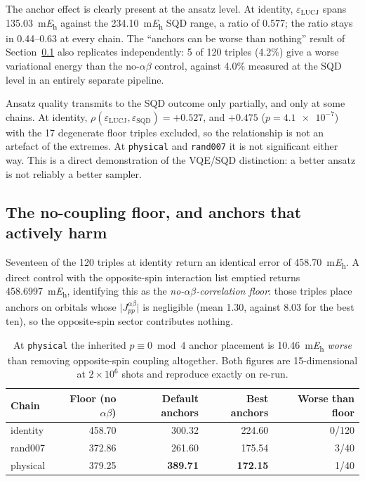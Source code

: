 \documentclass[11pt,a4paper]{article}
\begin{document}
The anchor effect is clearly present at the ansatz level. At 
identity, $\varepsilon_{\text{LUCJ}}$ spans \SI{135.03}{\milli\hartree}
against the \SI{234.10}{\milli\hartree} SQD range, a ratio of 0.577; the ratio
stays in \numrange{0.44}{0.63} at every chain. The
``anchors can be worse than nothing'' result of
Section~\ref{sec:floor} also replicates independently: 5 of 120 triples
(4.2\%) give a worse variational energy than the no-$\alpha\beta$ control,
against 4.0\% measured at the SQD level in an entirely separate pipeline.

Ansatz quality transmits to the SQD outcome only partially, and only at some
chains. At  identity,
$\rho(\varepsilon_{\text{LUCJ}}, \varepsilon_{\text{SQD}}) = +0.527$, and
$+0.475$ ($p=\num{4.1e-7}$) with the 17 degenerate floor triples excluded, so
the relationship is not an artefact of the extremes. At \texttt{physical} and
\texttt{rand007} it is not significant either way. This is a direct
demonstration of the VQE/SQD distinction: a better ansatz is not reliably a
better sampler.

\FloatBarrier
\subsection{The no-coupling floor, and anchors that actively harm}
\label{sec:floor}

Seventeen of the 120 triples at  identity return an identical error
of \SI{458.70}{\milli\hartree}. A direct control with the opposite-spin
interaction list emptied returns \SI{458.6997}{\milli\hartree}, identifying
this as the \emph{no-$\alpha\beta$-correlation floor}: those triples place
anchors on orbitals whose $\lvert J^{\alpha\beta}_{pp}\rvert$ is negligible
(mean 1.30, against 8.03 for the best ten), so the opposite-spin sector
contributes nothing.

\begin{table}[htbp]\centering\small
\begin{tabular}{lrrrr}
\toprule
Chain & Floor (no $\alpha\beta$) & Default anchors & Best anchors & Worse than floor\\
\midrule
identity  & 458.70 & 300.32 & 224.60 & 0/120\\
rand007   & 372.86 & 261.60 & 175.54 & 3/40\\
physical  & 379.25 & \textbf{389.71} & \textbf{172.15} & 1/40\\
\bottomrule
\end{tabular}
\caption{At \texttt{physical} the inherited $p\equiv 0\bmod 4$ anchor
placement is \SI{10.46}{\milli\hartree} \emph{worse} than removing
opposite-spin coupling altogether. Both figures are 15-dimensional at
$2\times10^{6}$ shots and reproduce exactly on re-run.}
\end{table}
\end{document}
